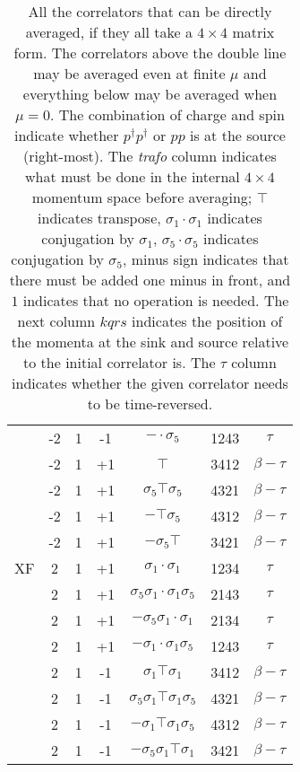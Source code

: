 \begin{table}[h]
\begin{tabular}{c|cccccc}
                    & -2 & 1 & -1 & $-\cdot\sigma_5$ & 1243 &  $\tau$  \\
                    & -2 & 1 & +1 & $\top$ & 3412 &  $\beta-\tau$  \\
                    & -2 & 1 & +1 & $\sigma_5\top\sigma_5$ & 4321 &  $\beta-\tau$  \\
                    & -2 & 1 & +1 & $-\top\sigma_5$ & 4312 &  $\beta-\tau$  \\
                    & -2 & 1 & +1 & $-\sigma_5\top$ & 3421 &  $\beta-\tau$  \\
  \hline
  XF                & 2 & 1 & +1 & $\sigma_1\cdot\sigma_1$ & 1234 &  $\tau$  \\
                    & 2 & 1 & +1 & $\sigma_5\sigma_1\cdot\sigma_1\sigma_5$ & 2143 &  $\tau$  \\
                    & 2 & 1 & +1 & $-\sigma_5\sigma_1\cdot\sigma_1$ & 2134 &  $\tau$  \\
                    & 2 & 1 & +1 & $-\sigma_1\cdot\sigma_1\sigma_5$ & 1243 &  $\tau$  \\
                    & 2 & 1 & -1 & $\sigma_1\top\sigma_1$ & 3412 &  $\beta-\tau$  \\
                    & 2 & 1 & -1 & $\sigma_5\sigma_1\top\sigma_1\sigma_5$ & 4321 &  $\beta-\tau$  \\
                    & 2 & 1 & -1 & $-\sigma_1\top\sigma_1\sigma_5$ & 4312 &  $\beta-\tau$  \\
                    & 2 & 1 & -1 & $-\sigma_5\sigma_1\top\sigma_1$ & 3421 &  $\beta-\tau$  \\
  \end{tabular}
  \caption{All the correlators that can be directly averaged, if they all take a $4 \times 4$ matrix form. The correlators above the double line may be averaged even at finite $\mu$ and everything below may be averaged when $\mu = 0$. The combination of charge and spin indicate whether $p^\dagger p^\dagger$ or $pp$ is at the source (right-most). The \textit{trafo} column indicates what must be done in the internal $4 \times 4$ momentum space before averaging; $\top$ indicates transpose, $\sigma_1\cdot\sigma_1$ indicates conjugation by $\sigma_1$, $\sigma_5\cdot\sigma_5$ indicates conjugation by $\sigma_5$, minus sign indicates that there must be added one minus in front, and $1$ indicates that no operation is needed. The next column $kqrs$ indicates the position of the momenta at the sink and source relative to the initial correlator is. The $\tau$ column indicates whether the given correlator needs to be time-reversed.}
  \label{tab:pppp}
\end{table}

